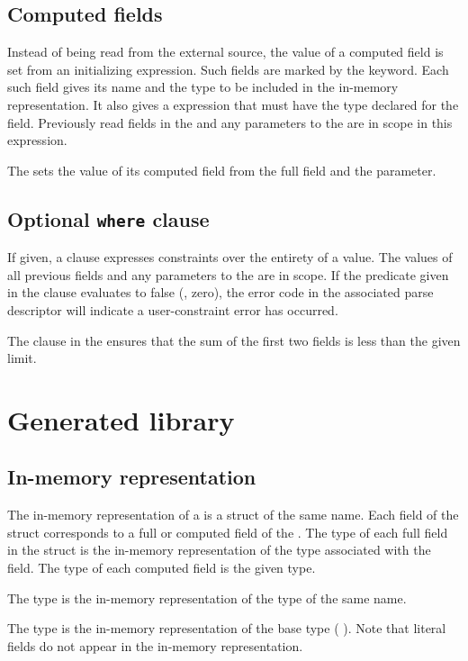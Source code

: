 \subsection{Computed fields}
Instead of being read from the external source, the value of a
computed field is set from an initializing expression.  Such fields
are marked by the \compute{} keyword.  Each such field gives its name
and the \C{} type to be included in the in-memory representation.  It
also gives a \C{} expression that must have the type declared for the
field.  Previously read fields in the \struct{} and any parameters
to the  are in scope in this expression.

The  \struct{} sets the value of its computed
field  from the full field  and the 
parameter. 



\subsection{Optional \texttt{where} clause}
If given, a \where{} clause expresses constraints over the entirety
of a \struct{} value.  The values of all previous fields and any
parameters to the \struct{} are in scope.  If the predicate given in
the \where{} clause evaluates to false (\ie{}, zero), the error code
in the associated parse descriptor will indicate a user-constraint
error has occurred.  

The \where{} clause in the  \struct{} ensures
that the sum of the first two fields is less than the given limit.


\section{Generated library}
\subsection{In-memory representation}
\label{sec:structs-rep}
The in-memory representation of a \struct{} is a \C{} struct of the
same name.  Each field of the \C{} struct corresponds to a full or
computed field of the \struct{}.  The type of each full field in
the \C{} struct is the in-memory representation of the \padsl{} type
associated with the field.  The type of each computed field is 
the given \C{} type. 

The \C{} type  is the in-memory representation of
the \padsl{} type of the same name.

The type  is the in-memory representation of the base
type  (\cf{} ).  Note that literal fields
do not appear in the in-memory representation. 

